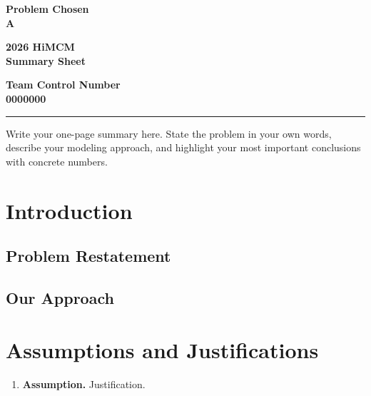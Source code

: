 \documentclass[12pt,letterpaper]{article}
\begin{document}
\thispagestyle{empty}
\noindent
\begin{minipage}[t]{0.3\textwidth}\centering
\textbf{Problem Chosen}\\[2pt]
{\Huge\bfseries\color{red} A}
\end{minipage}%
\begin{minipage}[t]{0.4\textwidth}\centering
\textbf{2026 HiMCM}\\
\textbf{Summary Sheet}
\end{minipage}%
\begin{minipage}[t]{0.3\textwidth}\centering
\textbf{Team Control Number}\\[2pt]
{\Huge\bfseries\color{red} 0000000}
\end{minipage}
\par\vspace{6pt}\hrule\vspace{14pt}

Write your one-page summary here. State the problem in your own words, describe your modeling approach, and highlight your most important conclusions with concrete numbers.

\newpage


\tableofcontents
\newpage


\section{Introduction}

\subsection{Problem Restatement}

\subsection{Our Approach}

\section{Assumptions and Justifications}

\begin{enumerate}
\item \textbf{Assumption.} Justification.
\end{enumerate}
\end{document}
